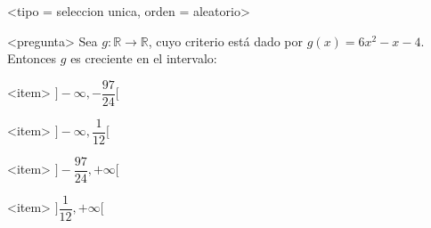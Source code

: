 <tipo = seleccion unica, orden = aleatorio>

<pregunta>
Sea $g:\mathbb R \to \mathbb R$, cuyo criterio est\'a dado por $g(x) = 6x^2 -x -4$. Entonces $g$ es creciente en el intervalo:


<item>
$\bigg]{-}\infty, -\dfrac{97}{24}\bigg[$

<item>
$\bigg]{-}\infty, \dfrac{1}{12}\bigg[$

<item>
$\bigg]-\dfrac{97}{24}, +\infty\bigg[$

<item>
$\bigg]\dfrac{1}{12}, +\infty\bigg[$



